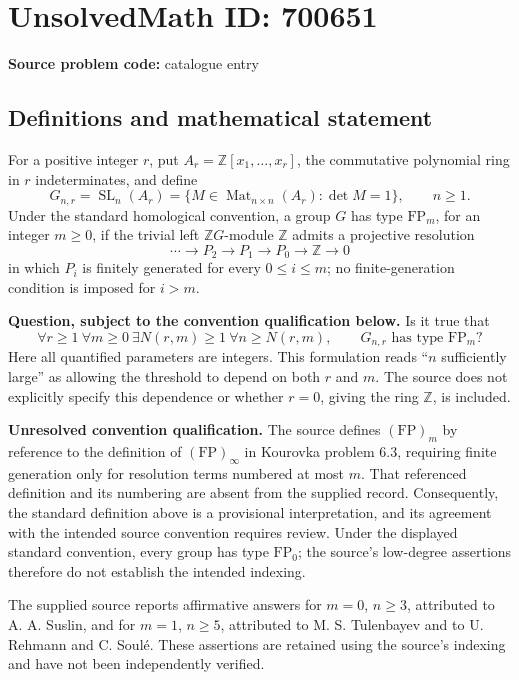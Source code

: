 \documentclass[11pt]{article}
\newcommand{\Z}{\mathbb{Z}}
\begin{document}
\section*{UnsolvedMath ID: 700651}
\textbf{Source problem code:} catalogue entry
\subsection{Definitions and mathematical statement}
For a positive integer \(r\), put \(A_r=\Z[x_1,\ldots,x_r]\), the commutative polynomial ring in \(r\) indeterminates, and define
\[
G_{n,r}=\operatorname{SL}_n(A_r)=\{M\in\operatorname{Mat}_{n\times n}(A_r):\det M=1\},\qquad n\geq 1.
\]
Under the standard homological convention, a group \(G\) has type \(\mathrm{FP}_m\), for an integer \(m\geq0\), if the trivial left \(\Z G\)-module \(\Z\) admits a projective resolution
\[
\cdots\longrightarrow P_2\longrightarrow P_1\longrightarrow P_0\longrightarrow\Z\longrightarrow0
\]
in which \(P_i\) is finitely generated for every \(0\leq i\leq m\); no finite-generation condition is imposed for \(i>m\).

\textbf{Question, subject to the convention qualification below.} Is it true that
\[
\forall r\geq1\ \forall m\geq0\ \exists N(r,m)\geq1\ \forall n\geq N(r,m),\qquad G_{n,r}\text{ has type }\mathrm{FP}_m?
\]
Here all quantified parameters are integers. This formulation reads ``\(n\) sufficiently large'' as allowing the threshold to depend on both \(r\) and \(m\). The source does not explicitly specify this dependence or whether \(r=0\), giving the ring \(\Z\), is included.

\textbf{Unresolved convention qualification.} The source defines \((\mathrm{FP})_m\) by reference to the definition of \((\mathrm{FP})_\infty\) in Kourovka problem 6.3, requiring finite generation only for resolution terms numbered at most \(m\). That referenced definition and its numbering are absent from the supplied record. Consequently, the standard definition above is a provisional interpretation, and its agreement with the intended source convention requires review. Under the displayed standard convention, every group has type \(\mathrm{FP}_0\); the source's low-degree assertions therefore do not establish the intended indexing.

The supplied source reports affirmative answers for \(m=0\), \(n\geq3\), attributed to A. A. Suslin, and for \(m=1\), \(n\geq5\), attributed to M. S. Tulenbayev and to U. Rehmann and C. Soul\'e. These assertions are retained using the source's indexing and have not been independently verified.
\end{document}
